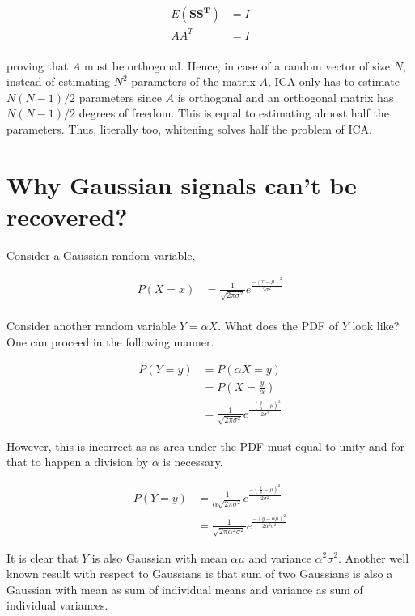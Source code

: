 \documentclass[11pt, a4paper]{article}
\begin{document}
\begin{align*}
	E(\boldsymbol{SS^T}) & = I \\
	AA^T                 & = I \\
\end{align*}

proving that $A$ must be orthogonal. Hence, in case of a random vector of size $N$, instead of estimating $N^2$ parameters of the matrix $A$, ICA only has to estimate $N(N-1)/2$ parameters since $A$ is orthogonal and an orthogonal matrix has $N(N-1)/2$ degrees of freedom. This is equal to estimating almost half the parameters. Thus, literally too, whitening solves half the problem of ICA.

\section{Why Gaussian signals can't be recovered?}

Consider a Gaussian random variable,

\begin{align*}
	P(X=x) & = \frac{1}{\sqrt{2\pi\sigma^2}} e^{\frac{-(x-\mu)^2}{2\sigma^2}} \\
\end{align*}

Consider another random variable $Y=\alpha X$. What does the PDF of $Y$ look like? One can proceed in the following manner.

\begin{align*}
	P(Y=y) & = P(\alpha X=y)                                                                 \\
	       & = P(X=\frac{y}{\alpha})                                                         \\
	       & = \frac{1}{\sqrt{2\pi\sigma^2}} e^{\frac{-(\frac{y}{\alpha}-\mu)^2}{2\sigma^2}} 
\end{align*} 

However, this is incorrect as as area under the PDF must equal to unity and for that to happen a division by $\alpha$ is necessary.

\begin{align*}
	P(Y=y) & = \frac{1}{\alpha \sqrt{2\pi\sigma^2}} e^{\frac{-(\frac{y}{\alpha}-\mu)^2}{2\sigma^2}}       \\
	       & = \frac{1}{\sqrt{2\pi \alpha^2 \sigma^2}} e^{\frac{-(y- \alpha \mu)^2}{2 \alpha^2 \sigma^2}} 
\end{align*}

It is clear that $Y$ is also Gaussian with mean $\alpha \mu$ and variance $\alpha^2 \sigma^2$. Another well known result with respect to Gaussians is that sum of two Gaussians is also a Gaussian with mean as sum of individual means and variance as sum of individual variances.
\end{document}
